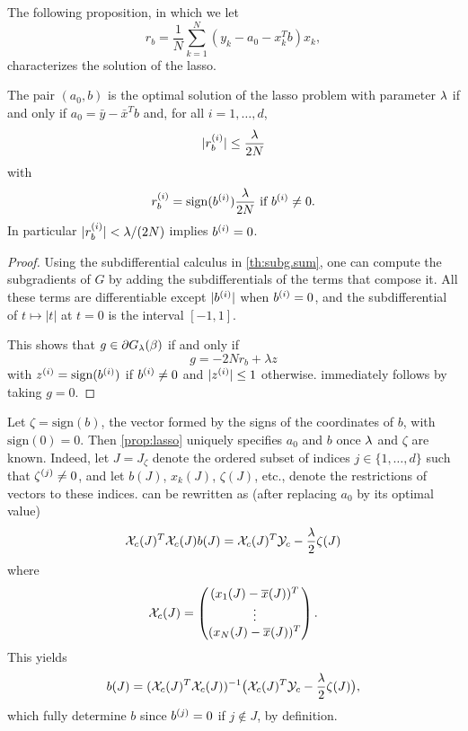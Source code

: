 The following proposition, in which we let
\[
r_b = \frac1N \sum_{k=1}^N (y_k-{a_0} - x_k^Tb) x_k,
\]
characterizes the solution of the lasso.
\begin{proposition}
\label{prop:lasso}
The pair $({a_0}, b)$ is the optimal solution of the lasso problem with parameter $\lambda$ if and only if ${a_0} = \bar y - \bar x^T b$ and, for all $i=1, \ldots, d$, 
\begin{equation}
\label{eq:lasso.resid}
|r_{b}^{(i)}| \leq \frac{\lambda}{2N} 
\end{equation}
with 
\begin{equation}
\label{eq:lasso.resid.2}
r_{b}^{(i)} = \mathrm{sign}(b^{(i)}) \frac{\lambda}{2N} \text{ if } b^{(i)} \neq 0.
\end{equation}
In particular $|r_{b}^{(i)}| < \lambda/(2N)$ implies $b^{(i)} = 0$.
\end{proposition}
\begin{proof}
Using the subdifferential calculus in  \cref{th:subg.sum}, one can  compute the subgradients of $G$ by adding the subdifferentials of the terms that compose it. All these terms are differentiable except $|b^{(i)}|$ when $b^{(i)} = 0$, and the  subdifferential of $t\mapsto |t|$ at $t=0$ is the interval $[-1,1]$. 

This shows that $g\in \partial G_\lambda(\beta)$ if and only if
\[
g = -2N r_b + \lambda z
\]
with $z^{(i)} = \operatorname{sign}(b^{(i)})$ if $b^{(i)} \neq 0$ and $|z^{(i)}| \leq 1$ otherwise. 
 immediately follows by taking $g=0$.
\end{proof}

Let $\zeta = \mathrm{sign}(b)$, the  vector formed by the signs of the coordinates of $b$, with $\mathrm{sign}(0) = 0$.
Then \cref{prop:lasso}  uniquely specifies ${a_0}$ and $b$ once $\lambda$ and $\zeta$ are known. Indeed, let $J = J_\zeta$ denote the ordered subset of indices $j\in\{1, \ldots, d\}$  such that $\zeta^{(j)}  \neq 0$, and let $b(J)$, $x_k(J)$, $\zeta(J)$, etc., denote the restrictions of vectors to these indices.   can be rewritten as (after replacing ${a_0}$ by its optimal value)  
\[
{\mathcal X}_c(J)^T{\mathcal X}_c(J) b(J) = {\mathcal X}_c(J)^T{\mathcal Y}_c - \frac{\lambda}2 \zeta(J)
\]
where
\[
{\mathcal X}_c(J) = \begin{pmatrix} (x_1(J) - \overline{x}(J))^T\\\vdots\\ (x_N(J) - \overline{x}(J))^T\end{pmatrix}.
\]
This yields
\begin{equation}
\label{eq:lasso.b}
b(J) = ({\mathcal X}_c(J)^T{\mathcal X}_c(J))^{-1} \big({\mathcal X}_c(J)^T{\mathcal Y}_c - \frac{\lambda}2 \zeta(J)\big), 
\end{equation}
which fully determine $b$ since $b^{(j)} = 0$ if $j\not\in J$, by definition.

